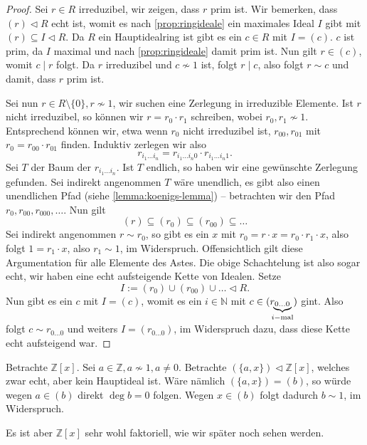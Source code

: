 \begin{proof}
    Sei $r \in R$ irreduzibel, wir zeigen, dass $r$ prim ist. Wir bemerken, dass $ (r) \vartriangleleft R $ echt ist, womit es nach \cref{prop:ringideale} ein maximales Ideal $I$ gibt mit $(r) \subseteq I \vartriangleleft R$. Da $R$ ein Hauptidealring ist gibt es ein $c \in R$ mit $I = (c)$. $c$ ist prim, da $I$ maximal und nach \cref{prop:ringideale} damit prim ist. Nun gilt $r \in (c)$, womit $c \mid r$ folgt. Da $r$ irreduzibel und $c\not\sim 1$ ist, folgt $r \mid c$, also folgt $r \sim c$ und damit, dass $r$ prim ist.

    Sei nun $r \in R \setminus \{0\}, r \not\sim 1$, wir suchen eine Zerlegung in irreduzible Elemente. Ist $r$ nicht irreduzibel, so können wir $r = r_0 \cdot r_1$ schreiben, wobei $r_0, r_1 \not\sim 1$. Entsprechend können wir, etwa wenn $r_0$ nicht irreduzibel ist, $r_{00}, r_{01}$ mit $r_0=r_{00}\cdot r_{01}$ finden. Induktiv zerlegen wir also
    $$ r_{i_1 \hdots i_n} = r_{i_1 \hdots i_n 0} \cdot r_{i_1 \hdots i_n 1}. $$
    Sei $T$ der Baum der $r_{i_1 \hdots i_n}$. Ist $T$ endlich, so haben wir eine gewünschte Zerlegung gefunden. Sei indirekt angenommen $T$ wäre unendlich, es gibt also einen unendlichen Pfad (siehe \cref{lemma:koenigs-lemma}) -- \obda betrachten wir den Pfad $r_0, r_{00}, r_{000}, \hdots$. Nun gilt
    $$ (r) \subseteq (r_0) \subseteq (r_{00}) \subseteq \hdots $$
    Sei indirekt angenommen $r \sim r_0$, so gibt es ein $x$ mit $r_0 = r \cdot x = r_0 \cdot r_1 \cdot x$, also folgt $ 1 = r_1 \cdot x$, also $r_1 \sim 1$, im Widerspruch. Offensichtlich gilt diese Argumentation für alle Elemente des Astes. Die obige Schachtelung ist also sogar echt, wir haben eine echt aufsteigende Kette von Idealen. Setze
    $$ I := (r_0) \cup (r_{00}) \cup \hdots \vartriangleleft R. $$
    Nun gibt es ein $c$ mit $I = (c)$, womit es ein $i\in\mathbb{N}$ mit  $c \in (r\hspace*{-5pt}\underbrace{_{0 \hdots 0}}_{i\mathrm{-mal}})$ gint. Also folgt $c \sim r_{0 \hdots 0}$ und weiters $I = (r_{0 \hdots 0})$, im Widerspruch dazu, dass diese Kette echt aufsteigend war.
\end{proof}

\begin{example}
    Betrachte $\mathbb{Z}[x]$. Sei $a \in \mathbb{Z}, a \not\sim 1, a \neq 0$. Betrachte $(\{a,x\}) \vartriangleleft \mathbb{Z}[x]$, welches zwar echt, aber kein Hauptideal ist. Wäre nämlich $(\{a,x\}) = (b)$, so würde wegen $a \in (b)$ direkt $\deg b = 0$ folgen. Wegen $x \in (b)$ folgt dadurch $b\sim1$, im Widerspruch.

    Es ist aber $\mathbb{Z}[x]$ sehr wohl faktoriell, wie wir später noch sehen werden.
\end{example}

